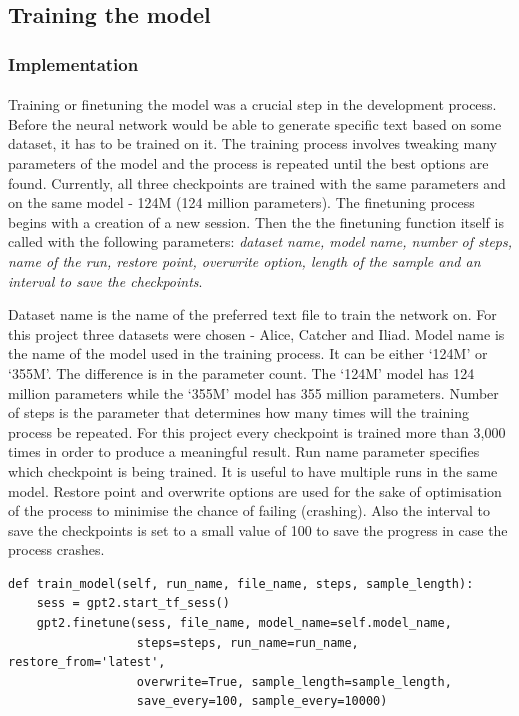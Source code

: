 \documentclass[12pt]{report}
\newenvironment{code}{\captionsetup{type=listing}}{}
\begin{document}
\subsection*{Training the model}
\subsubsection*{Implementation}
\paragraph{}
Training or finetuning the model was a crucial step in the development process. Before the neural network would
be able to generate specific text based on some dataset, it has to be trained on it. The training process involves
tweaking many parameters of the model and the process is repeated until the best options are found. Currently,
all three checkpoints are trained with the same parameters and on the same model - 124M (124 million parameters). 
The finetuning process begins with a creation of a new session. Then the the finetuning function itself is called
with the following parameters: \textit{dataset name, model name, number of steps, name of the run, restore point,
overwrite option, length of the sample and an interval to save the checkpoints}.

Dataset name is the name of the preferred text file to train the network on. For this project three datasets were
chosen - Alice, Catcher and Iliad. Model name is the name of the model used in the training process. It can be either
`124M' or `355M'. The difference is in the parameter count. The `124M' model has 124 million parameters while the
`355M' model has 355 million parameters. Number of steps is the parameter that determines how many times will the
training process be repeated. For this project every checkpoint is trained more than 3,000 times in order to
produce a meaningful result. Run name parameter specifies which checkpoint is being trained. It is useful to have
multiple runs in the same model. Restore point and overwrite options are used for the sake of optimisation of the
process to minimise the chance of failing (crashing). Also the interval to save the checkpoints is set to a small
value of 100 to save the progress in case the process crashes.

\begin{code}
\begin{verbatim}
def train_model(self, run_name, file_name, steps, sample_length):
    sess = gpt2.start_tf_sess()
    gpt2.finetune(sess, file_name, model_name=self.model_name,
                  steps=steps, run_name=run_name, restore_from='latest',
                  overwrite=True, sample_length=sample_length,
                  save_every=100, sample_every=10000)
\end{verbatim}
\end{code}
\end{document}
